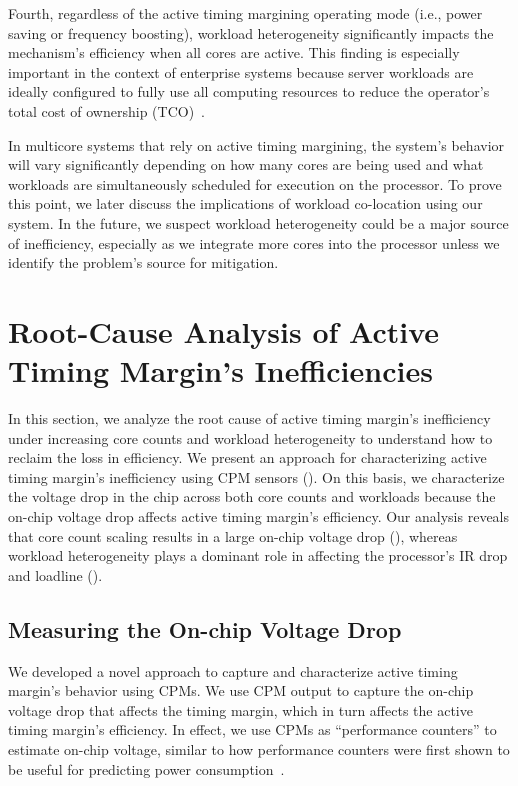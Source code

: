 Fourth, regardless of the active timing margining operating mode (i.e., power saving or frequency boosting), workload heterogeneity significantly impacts the mechanism's efficiency when all cores are active. This finding is especially important in the context of enterprise systems because server workloads are ideally configured to fully use all computing resources to reduce the operator's total cost of ownership (TCO)~\cite{barroso2007case}. 

In multicore systems that rely on active timing margining, the system's behavior will vary significantly depending on how many cores are being used and what workloads are simultaneously scheduled for execution on the processor. To prove this point, we later discuss the implications of workload co-location using our system. In the future, we suspect workload heterogeneity could be a major source of inefficiency, especially as we integrate more cores into the processor unless we identify the problem's source for mitigation.

\section{Root-Cause Analysis of Active Timing Margin's Inefficiencies}
\label{sec:voltage:rootcause}

In this section, we analyze the root cause of active timing margin's inefficiency under increasing core counts and workload heterogeneity to understand how to reclaim the loss in efficiency. We present an approach for characterizing active timing margin's inefficiency using CPM sensors (). On this basis, we characterize the voltage drop in the chip across both core counts and workloads because the on-chip voltage drop affects active timing margin's efficiency. Our analysis reveals that core count scaling results in a large on-chip voltage drop (), whereas workload heterogeneity plays a dominant role in affecting the processor's IR drop and loadline ().

\subsection{Measuring the On-chip Voltage Drop}
\label{sec:voltage:rootcause:cpm-measurement}

We developed a novel approach to capture and characterize active timing margin's behavior using CPMs. We use CPM output to capture the on-chip voltage drop that affects the timing margin, which in turn affects the active timing margin's efficiency. In effect, we use CPMs as ``performance counters'' to estimate on-chip voltage, similar to how performance counters were first shown to be useful for predicting power consumption~\cite{isci2003runtime,huang2012accurate}.

